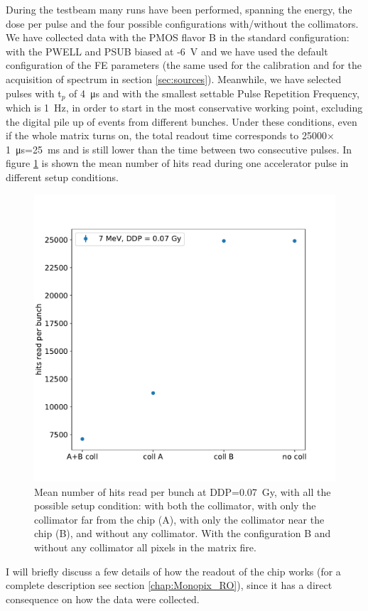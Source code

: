    During the testbeam many runs have been performed, spanning the energy, the dose per pulse and the four possible configurations with/without the collimators. 
   We have collected data with the PMOS flavor B in the standard configuration: with the PWELL and PSUB biased at -\SI{6}{V} and we have used the default configuration of the FE parameters (the same used for the calibration and for the acquisition of spectrum in section \ref{sec:sources}).
   Meanwhile, we have selected pulses with t$_p$ of \SI{4}{\us} and with the smallest settable Pulse Repetition Frequency, which is \SI{1}{Hz}, in order to start in the most conservative working point, excluding the digital pile up of events from different bunches. Under these conditions, even if the whole matrix turns on, the total readout time corresponds to 25000$\times$\SI{1}{\us}=\SI{25}{ms} and is still lower than the time between two consecutive pulses.
   In figure \ref{fig:hits_FLASH} is shown the mean number of hits read during one accelerator pulse in different setup conditions.
   \begin{figure}
      \centering
      \includegraphics[width=.49\linewidth]{figures/test_beam/hits.pdf}
      \caption{Mean number of hits read per bunch at DDP=\SI{0.07}{Gy}, with all the possible setup condition: with both the collimator, with only the collimator far from the chip (A), with only the collimator near the chip (B), and without any collimator. With the configuration B and without any collimator all pixels in the matrix fire.}
      \label{fig:hits_FLASH}
   \end{figure}

   
  I will briefly discuss a few details of how the readout of the chip works (for a complete description see section \ref{chap:Monopix_RO}), since it has a direct consequence on how the data were collected. 


